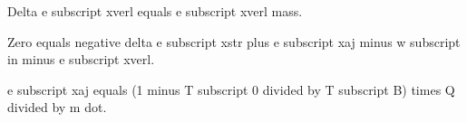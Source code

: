 Delta e subscript xverl equals e subscript xverl mass.  

Zero equals negative delta e subscript xstr plus e subscript xaj minus w subscript in minus e subscript xverl.  

e subscript xaj equals (1 minus T subscript 0 divided by T subscript B) times Q divided by m dot.